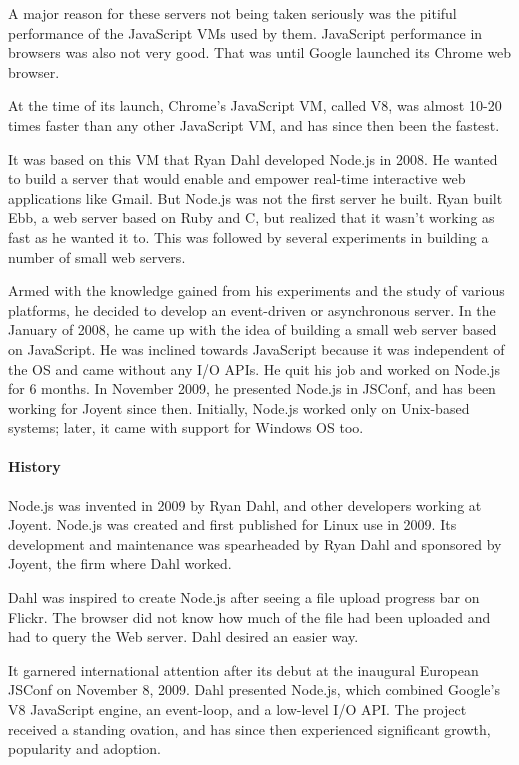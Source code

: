 A major reason for these servers not being taken seriously was the pitiful performance
of the JavaScript VMs used by them. JavaScript performance in browsers was also not
very good. That was until Google launched its Chrome web browser.

At the time of its launch, Chrome's JavaScript VM, called V8, was almost 10-20 times
faster than any other JavaScript VM, and has since then been the fastest.

It was based on this VM that Ryan Dahl developed Node.js in 2008. He wanted to
build a server that would enable and empower real-time interactive web applications
like Gmail. But Node.js was not the first server he built. Ryan built Ebb, a web server
based on Ruby and C, but realized that it wasn't working as fast as he wanted it to.
This was followed by several experiments in building a number of small web servers.

Armed with the knowledge gained from his experiments and the study of various
platforms, he decided to develop an event-driven or asynchronous server. In the
January of 2008, he came up with the idea of building a small web server based on
JavaScript. He was inclined towards JavaScript because it was independent of the
OS and came without any I/O APIs. He quit his job and worked on Node.js for 6
months. In November 2009, he presented Node.js in JSConf, and has been working
for Joyent since then. Initially, Node.js worked only on Unix-based systems; later, it
came with support for Windows OS too.

\paragraph*{History}
\hfill \break
Node.js was invented in 2009 by Ryan Dahl, and other developers working at Joyent. Node.js was created and first published for Linux use in 2009. Its development and maintenance was spearheaded by Ryan Dahl and sponsored by Joyent, the firm where Dahl worked.

Dahl was inspired to create Node.js after seeing a file upload progress bar on Flickr. The browser did not know how much of the file had been uploaded and had to query the Web server. Dahl desired an easier way.

It garnered international attention after its debut at the inaugural European JSConf on November 8, 2009. Dahl presented Node.js, which combined Google's V8 JavaScript engine, an event-loop, and a low-level I/O API. The project received a standing ovation, and has since then experienced significant growth, popularity and adoption.

